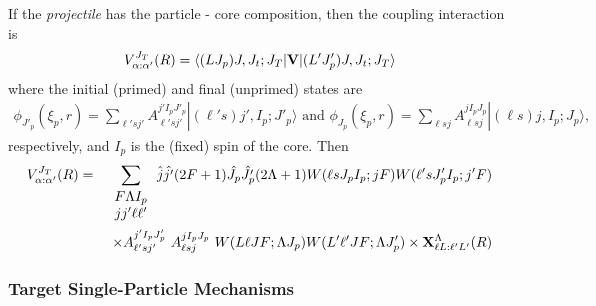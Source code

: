 \documentclass[11pt,a4paper]{article}
\begin{document}
If the {\em projectile} has the particle - core composition, then the
coupling interaction is
\begin{eqnarray}
 V^{J_T}_{\alpha :\alpha'} (R) =
\langle (L       J      _p)J, J_t ;J_T | {\bf V} |
   (L' J'_ p)J, J_t ;J_T\rangle
\end{eqnarray}
where the initial (primed) and final (unprimed) states are
\begin{eqnarray}
   \phi_{J'_ p} (\xi_p , r) =
    \sum_{\ell' sj'}
      A_{\ell ' sj'}^{j' I_p J'_ p}
      | ( \ell' s) j' , I_p ; J'_ p\rangle
       \mbox{  and }
   \phi_{J_p} (\xi_p , r) =
    \sum_{\ell sj}
      A_{\ell  sj}^{jI_p J_p}
    | ( \ell s) j , I_p ; J_p\rangle ,
\end{eqnarray}
respectively, and $I_p$ is the (fixed) spin of the core.
Then
\begin{eqnarray} \nonumber
 V^{J_T}_{\alpha :\alpha'} (R)
     &=&
 \sum_{\begin{array}{c}F \Lambda I_p\\j j' \ell \ell'\end{array}}
     {\hat j \hat {j'} (2F+1) \hat {J_p} \hat {J'_ p} (2 \Lambda+1)
     W(\ell s J_p I_p ; j F)
     W(\ell' s J'_ p I_p ; j' F)  }
\\
 && \times
  A_{\ell ' sj'}^{j' I_p J'_ p} ~
  A_{\ell  sj}^{jI_p J_p} ~
  W(L \ell J F; \Lambda J_p)
  W(L' \ell' J F; \Lambda J'_ p)
  \times
  {\bf X}^\Lambda_{\ell L: \ell' L'} (R)
\end{eqnarray}
\subsubsection{Target Single-Particle Mechanisms}
\end{document}
